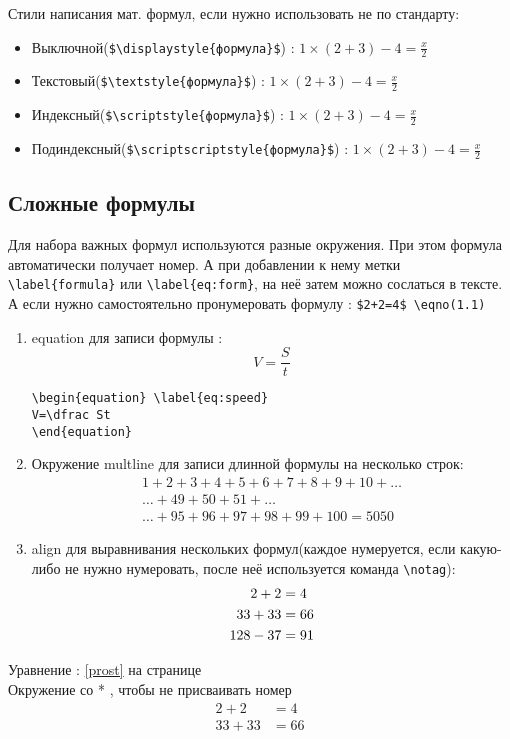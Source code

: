 \documentclass[a4paper,12pt]{article}%
\theoremstyle{plain}%
\theoremstyle{definition}%
\theoremstyle{remark}%
\begin{document}
Стили написания мат. формул, если нужно использовать не по стандарту: \\
\begin{itemize}
\item Выключной(\verb|$\displaystyle{формула}$|) : $\displaystyle 1\times(2+3)-4=\frac x2$
\item Текстовый(\verb|$\textstyle{формула}$|) : $\textstyle 1\times(2+3)-4=\frac x2$
\item Индексный(\verb|$\scriptstyle{формула}$|) : $\scriptstyle 1\times(2+3)-4=\frac x2$
\item Подиндексный(\verb|$\scriptscriptstyle{формула}$|) : $\scriptscriptstyle 1\times(2+3)-4=\frac x2$
\end{itemize}



\subsection{Сложные формулы}

Для набора важных формул используются разные окружения. При этом формула автоматически получает номер. А при добавлении к нему метки \verb|\label{formula}| или \verb|\label{eq:form}|, на неё затем можно сослаться в тексте. А если нужно самостоятельно пронумеровать формулу : \verb|$2+2=4$ \eqno(1.1)|  \\
\begin{enumerate}
\item equation для записи формулы :
\begin{equation} \label{eq:speed}
V=\dfrac St
\end{equation}
\begin{verbatim}
\begin{equation} \label{eq:speed}
V=\dfrac St
\end{equation}
\end{verbatim}
\item Окружение multline для записи длинной формулы на несколько строк:
\begin{multline}
1+2+3+4+5+6+7+8+9+10+\dots \\ \dots+49+50+51+\dots \\ \dots+95+96+97+98+99+100=5050
\end{multline}
\item align для выравнивания нескольких формул(каждое нумеруется, если какую-либо не нужно нумеровать, после неё используется команда \verb|\notag|):
\begin{align}
2+2&=4 \label{prost} \\
33+33&=66\notag \\%
128-37&=91
\end{align}
\end{enumerate}
Уравнение : \eqref{prost} на странице \pageref{prost} \\
Окружение со * , чтобы не присваивать номер
\begin{align*}%
2+2&=4 \\ 
33+33&=66
\end{align*}
\end{document}

